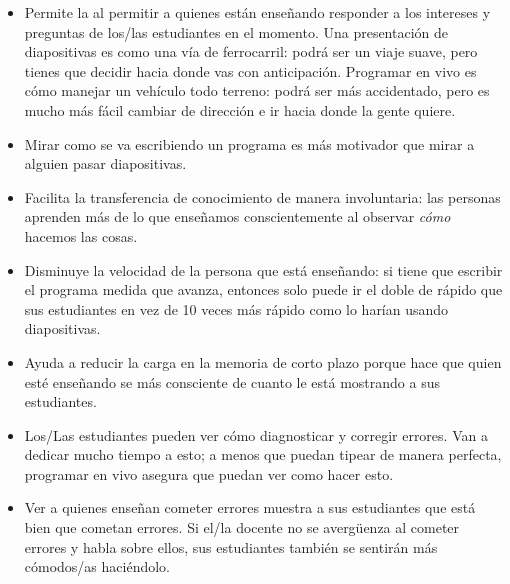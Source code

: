 \begin{itemize}

\item
  Permite la 
  al permitir a quienes están enseñando responder a los intereses y preguntas de los/las estudiantes en el momento.
  Una presentación de diapositivas es como una vía de ferrocarril:
  podrá ser un viaje suave,
  pero tienes que decidir hacia donde vas con anticipación.
  Programar en vivo es cómo manejar un vehículo todo terreno:
  podrá ser más accidentado,
  pero es mucho más fácil cambiar de dirección e ir hacia donde la gente quiere.

\item
  Mirar como se va escribiendo un programa es más motivador
  que mirar a alguien pasar diapositivas.

\item
  Facilita la transferencia de conocimiento de manera involuntaria:
  las personas aprenden más de lo que enseñamos conscientemente
  al observar \emph{cómo} hacemos las cosas.

\item
  Disminuye la velocidad de la persona que está enseñando:
  si tiene que escribir el programa medida que avanza,
  entonces solo puede ir el doble de rápido que sus estudiantes
  en vez de 10 veces más rápido como lo harían usando diapositivas.

\item
  Ayuda a reducir la carga en la memoria de corto plazo
  porque hace que quien esté enseñando se más consciente de cuanto 
  le está mostrando a sus estudiantes.

\item
  Los/Las estudiantes pueden ver cómo diagnosticar y corregir errores.
  Van a dedicar mucho tiempo a esto;
  a menos que puedan tipear de manera perfecta,
  programar en vivo asegura que puedan ver como hacer esto.

\item
  Ver a quienes enseñan cometer errores muestra a sus estudiantes que está bien que cometan errores.
  Si el/la docente no se avergüenza al cometer errores y habla sobre ellos,
  sus estudiantes también se sentirán más cómodos/as haciéndolo.

\end{itemize}


